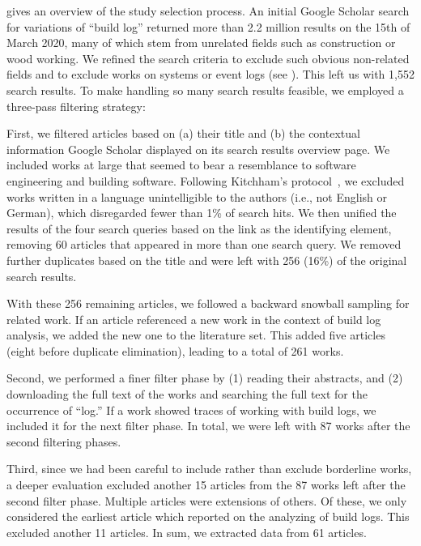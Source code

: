  gives an overview of the study selection
process. An initial Google Scholar search for variations of ``build log''
returned more than 2.2 million results on the 15th of March 2020, many of which stem
from unrelated fields such as construction or wood working.
We refined the search criteria to exclude such obvious
non-related fields and to exclude works on systems
or event logs (see ).
This left us with 1,552 search results.
To make handling so many search results feasible, we employed a
three-pass filtering strategy:

First, we filtered articles based on (a) their title and (b) the
contextual information Google Scholar displayed on its search results overview page.
We included works at large that seemed to bear a resemblance to software
engineering and building software.
Following Kitchham's protocol~\cite{kitchenham2009systematic}, we excluded works written in a language unintelligible to the authors
(i.e., not English or German), which disregarded fewer than 1\% of search
hits.
We then unified
the results of the four search queries based on the link as the
identifying element, removing 60 articles that appeared in more than
one search query.
We removed further duplicates based on the title and were
left with 256 (16\%) of the original search results.

With these 256 remaining articles, we followed a backward snowball
sampling for related work.
If an article referenced a new work in the context
of build log analysis, we added the new one to the literature set.
This added five articles (eight before
duplicate elimination), leading to a total of 261
works.

Second, we performed a finer filter phase by (1) reading their abstracts, and (2) downloading the
full text of the works and searching the
full text
for the occurrence of ``log.''
If a work showed traces of
working with build logs, we included it for the next filter phase.
In total, we
were left with 87 works after the second filtering phases.

Third, since we had been careful to include rather than exclude borderline
works, a deeper evaluation excluded another 15 articles from the 87
works left after the second filter phase.
Multiple articles were extensions of others.
Of these, we only considered the earliest article which reported on
the analyzing of build logs.
This excluded another 11 articles.
In sum, we extracted data from 61 articles.

